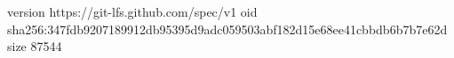 version https://git-lfs.github.com/spec/v1
oid sha256:347fdb9207189912db95395d9adc059503abf182d15e68ee41cbbdb6b7b7e62d
size 87544

